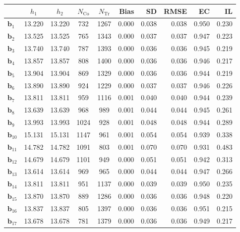 \documentclass[10pt]{article}
\newcommand{\bb}{\mathbf{b}}
\begin{document}
\begin{table}[p]
    \caption{Intention-to-Treat Effects (Simulations, $s=3$, ITT Bandwidth Selector).}
    \label{tab:sa-simuls-itt-s3}
\end{table}

\begin{table}[p]
    \centering
\begin{tabular}{lccccrrrrr}
\toprule\toprule
 & $h_1$ & $h_2$ & $N_{\mathrm{Co}}$ & $N_{\mathrm{Tr}}$ & Bias & SD & RMSE & EC & IL \\
\midrule
$\bb_{1}$ & 13.220 & 13.220 & 732 & 1267 & 0.000 & 0.038 & 0.038 & 0.950 & 0.230 \\
$\bb_{2}$ & 13.525 & 13.525 & 765 & 1343 & 0.000 & 0.037 & 0.037 & 0.947 & 0.223 \\
$\bb_{3}$ & 13.740 & 13.740 & 787 & 1393 & 0.000 & 0.036 & 0.036 & 0.945 & 0.219 \\
$\bb_{4}$ & 13.857 & 13.857 & 808 & 1400 & 0.000 & 0.036 & 0.036 & 0.946 & 0.217 \\
$\bb_{5}$ & 13.904 & 13.904 & 869 & 1329 & 0.000 & 0.036 & 0.036 & 0.944 & 0.219 \\
$\bb_{6}$ & 13.890 & 13.890 & 924 & 1229 & 0.000 & 0.037 & 0.037 & 0.946 & 0.226 \\
$\bb_{7}$ & 13.811 & 13.811 & 959 & 1116 & 0.001 & 0.040 & 0.040 & 0.944 & 0.239 \\
$\bb_{8}$ & 13.639 & 13.639 & 968 & 989 & 0.001 & 0.044 & 0.044 & 0.945 & 0.261 \\
$\bb_{9}$ & 13.993 & 13.993 & 1024 & 928 & 0.001 & 0.048 & 0.048 & 0.944 & 0.289 \\
$\bb_{10}$ & 15.131 & 15.131 & 1147 & 961 & 0.001 & 0.054 & 0.054 & 0.939 & 0.338 \\
$\bb_{11}$ & 14.782 & 14.782 & 1091 & 803 & 0.001 & 0.070 & 0.070 & 0.931 & 0.483 \\
$\bb_{12}$ & 14.679 & 14.679 & 1101 & 949 & 0.000 & 0.051 & 0.051 & 0.942 & 0.313 \\
$\bb_{13}$ & 13.614 & 13.614 & 969 & 965 & 0.000 & 0.044 & 0.044 & 0.947 & 0.266 \\
$\bb_{14}$ & 13.811 & 13.811 & 951 & 1137 & 0.000 & 0.039 & 0.039 & 0.950 & 0.235 \\
$\bb_{15}$ & 13.870 & 13.870 & 889 & 1286 & 0.000 & 0.036 & 0.036 & 0.948 & 0.220 \\
$\bb_{16}$ & 13.837 & 13.837 & 805 & 1397 & 0.000 & 0.036 & 0.036 & 0.951 & 0.215 \\
$\bb_{17}$ & 13.678 & 13.678 & 781 & 1379 & 0.000 & 0.036 & 0.036 & 0.949 & 0.217 \\

\end{tabular}
\end{table}
\end{document}
